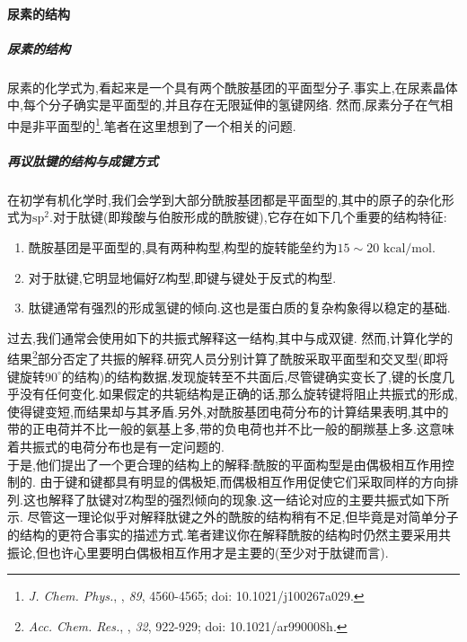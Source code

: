 \documentclass{ctexart}
\begin{document}
\paragraph{尿素的结构}
\subparagraph{尿素的结构}
尿素的化学式为,看起来是一个具有两个酰胺基团的平面型分子.事实上,在尿素晶体中,每个分子确实是平面型的,并且存在无限延伸的氢键网络.
然而,尿素分子在气相中是非平面型的\footnote{\textit{J. Chem. Phys.}, , \textit{89}, 4560-4565; doi: 10.1021/j100267a029.}.笔者在这里想到了一个相关的问题.
\subparagraph{再议肽键的结构与成键方式}
在初学有机化学时,我们会学到大部分酰胺基团都是平面型的,其中的原子的杂化形式为$\text{sp}^2$.对于肽键(即羧酸与伯胺形成的酰胺键),它存在如下几个重要的结构特征:
\begin{enumerate}[label=\tbf{\arabic*.},topsep=0pt,parsep=0pt,itemsep=0pt,partopsep=0pt]
    \item 酰胺基团是平面型的,具有两种构型,构型的旋转能垒约为$15\sim20\text{ kcal/mol}$.
    \item 对于肽键,它明显地偏好Z构型,即键与键处于反式的构型.
    \item 肽键通常有强烈的形成氢键的倾向.这也是蛋白质的复杂构象得以稳定的基础.
\end{enumerate}
过去,我们通常会使用如下的共振式解释这一结构,其中与成双键.
然而,计算化学的结果\footnote{\textit{Acc. Chem. Res.}, , \textit{32}, 922-929; doi: 10.1021/ar990008h.}部分否定了共振的解释.研究人员分别计算了酰胺采取平面型和交叉型(即将键旋转$90^\circ$的结构)的结构数据,发现旋转至不共面后,尽管键确实变长了,键的长度几乎没有任何变化.如果假定的共轭结构是正确的话,那么旋转键将阻止共振式的形成,使得键变短,而结果却与其矛盾.另外,对酰胺基团电荷分布的计算结果表明,其中的带的正电荷并不比一般的氨基上多,带的负电荷也并不比一般的酮羰基上多.这意味着共振式的电荷分布也是有一定问题的.\\
\indent 于是,他们提出了一个更合理的结构上的解释:酰胺的平面构型是由偶极相互作用控制的.
由于键和键都具有明显的偶极矩,而偶极相互作用促使它们采取同样的方向排列.这也解释了肽键对Z构型的强烈倾向的现象.这一结论对应的主要共振式如下所示.
尽管这一理论似乎对解释肽键之外的酰胺的结构稍有不足,但毕竟是对简单分子的结构的更符合事实的描述方式.笔者建议你在解释酰胺的结构时仍然主要采用共振论,但也许心里要明白偶极相互作用才是主要的(至少对于肽键而言).
\end{document}
